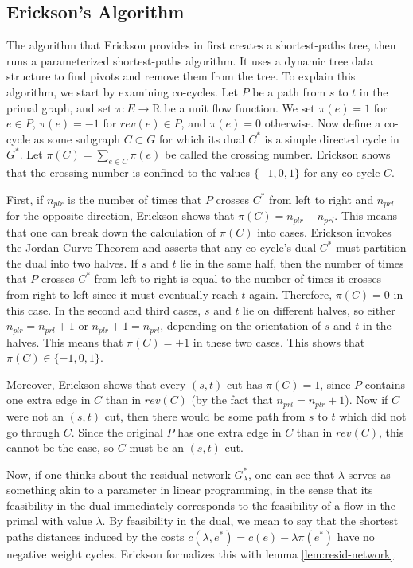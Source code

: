 \documentclass[12pt]{article}
\begin{document}
\subsection{Erickson's Algorithm}

The algorithm that Erickson provides in \cite{erickson2010} first creates a shortest-paths tree, then runs a parameterized shortest-paths algorithm. It uses a dynamic tree data structure to find pivots and remove them from the tree. To explain this algorithm, we start by examining co-cycles. Let $P$ be a path from $s$ to $t$ in the primal graph, and set $\pi : E \to \mathrm{R}$ be a unit flow function. We set $\pi(e) = 1$ for $ e \in P$, $\pi(e) = -1$ for $rev(e) \in P$, and $\pi(e) = 0$ otherwise. Now define a co-cycle as some subgraph $C \subset G$ for which its dual $C^*$ is a simple directed cycle in $G^*$. Let $\pi(C) = \sum_{e \in C} \pi(e)$ be called the crossing number. Erickson shows that the crossing number is confined to the values $\{-1,0,1\}$ for any co-cycle $C$. 

First, if $n_{plr}$ is the number of times that $P$ crosses $C^*$ from left to right and $n_{prl}$ for the opposite direction, Erickson shows that $\pi(C) = n_{plr} - n_{prl}$. This means that one can break down the calculation of $\pi(C)$ into cases. Erickson invokes the Jordan Curve Theorem and asserts that any co-cycle's dual $C^*$ must partition the dual into two halves. If $s$ and $t$ lie in the same half, then the number of times that $P$ crosses $C^*$ from left to right is equal to the number of times it crosses from right to left since it must eventually reach $t$ again. Therefore, $\pi(C) = 0$ in this case. In the second and third cases, $s$ and $t$ lie on different halves, so either $n_{plr} = n_{prl} + 1$ or $n_{plr} + 1 = n_{prl}$, depending on the orientation of $s$ and $t$ in the halves. This means that $\pi(C) = \pm 1$ in these two cases. This shows that $\pi(C) \in \{-1,0,1\}$.

Moreover, Erickson shows that every $(s,t)$ cut has $\pi(C) = 1$, since $P$ contains one extra edge in $C$ than in $rev(C)$ (by the fact that $n_{prl} = n_{plr} + 1$). Now if $C$ were not an $(s,t)$ cut, then there would be some path from $s$ to $t$ which did not go through $C$. Since the original $P$ has one extra edge in $C$ than in $rev(C)$, this cannot be the case, so $C$ must be an $(s,t)$ cut.

Now, if one thinks about the residual network $G^*_\lambda$, one can see that $\lambda$ serves as something akin to a parameter in linear programming, in the sense that its feasibility in the dual immediately corresponds to the feasibility of a flow in the primal with value $\lambda$. By feasibility in the dual, we mean to say that the shortest paths distances induced by the costs $c(\lambda, e^*) = c(e) - \lambda \pi(e^*)$ have no negative weight cycles. Erickson formalizes this with lemma \ref{lem:resid-network}.
\end{document}
